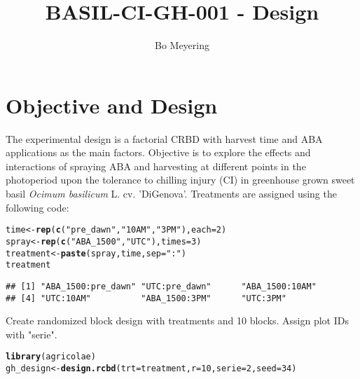 \documentclass{article}\usepackage[]{graphicx}\usepackage[]{color}
\title{BASIL-CI-GH-001 - Design}
\author{Bo Meyering}
\makeatletter
\newcommand{\hlnum}[1]{\textcolor[rgb]{0.686,0.059,0.569}{#1}}%
\newcommand{\hlstr}[1]{\textcolor[rgb]{0.192,0.494,0.8}{#1}}%
\newcommand{\hlstd}[1]{\textcolor[rgb]{0.345,0.345,0.345}{#1}}%
\newcommand{\hlkwb}[1]{\textcolor[rgb]{0.69,0.353,0.396}{#1}}%
\newcommand{\hlkwc}[1]{\textcolor[rgb]{0.333,0.667,0.333}{#1}}%
\newcommand{\hlkwd}[1]{\textcolor[rgb]{0.737,0.353,0.396}{\textbf{#1}}}%
\newenvironment{kframe}{%
 \def\at@end@of@kframe{}%
 \ifinner\ifhmode%
  \def\at@end@of@kframe{\end{minipage}}%
  \begin{minipage}{\columnwidth}%
 \fi\fi%
 \def\FrameCommand##1{\hskip\@totalleftmargin \hskip-\fboxsep
 \colorbox{shadecolor}{##1}\hskip-\fboxsep
     \hskip-\linewidth \hskip-\@totalleftmargin \hskip\columnwidth}%
 \MakeFramed {\advance\hsize-\width
   \@totalleftmargin\z@ \linewidth\hsize
   \@setminipage}}%
 {\par\unskip\endMakeFramed%
 \at@end@of@kframe}
\newenvironment{knitrout}{}{} %
\makeatother
\begin{document}
\maketitle
\section{Objective and Design}
The experimental design is a factorial CRBD with harvest time and ABA applications as the main factors. Objective is to explore the effects and interactions of spraying ABA and harvesting at different points in the photoperiod upon the tolerance to chilling injury (CI) in greenhouse grown sweet basil \emph{Ocimum basilicum} L. cv. 'DiGenova'. Treatments are assigned using the following code:
\begin{knitrout}
\color{fgcolor}\begin{kframe}
\begin{alltt}
\hlstd{time} \hlkwb{<-} \hlkwd{rep}\hlstd{(}\hlkwd{c}\hlstd{(}\hlstr{"pre_dawn"}\hlstd{,} \hlstr{"10AM"}\hlstd{,} \hlstr{"3PM"}\hlstd{),} \hlkwc{each} \hlstd{=} \hlnum{2}\hlstd{)}
\hlstd{spray} \hlkwb{<-} \hlkwd{rep}\hlstd{(}\hlkwd{c}\hlstd{(}\hlstr{"ABA_1500"}\hlstd{,} \hlstr{"UTC"}\hlstd{),} \hlkwc{times} \hlstd{=} \hlnum{3}\hlstd{)}
\hlstd{treatment} \hlkwb{<-} \hlkwd{paste}\hlstd{(spray, time,} \hlkwc{sep} \hlstd{=} \hlstr{":"}\hlstd{)}
\hlstd{treatment}
\end{alltt}
\begin{verbatim}
## [1] "ABA_1500:pre_dawn" "UTC:pre_dawn"      "ABA_1500:10AM"    
## [4] "UTC:10AM"          "ABA_1500:3PM"      "UTC:3PM"
\end{verbatim}
\end{kframe}
\end{knitrout}
Create randomized block design with treatments and 10 blocks. Assign plot IDs with "serie".
\begin{knitrout}
\color{fgcolor}\begin{kframe}
\begin{alltt}
\hlkwd{library}\hlstd{(agricolae)}
\hlstd{gh_design} \hlkwb{<-} \hlkwd{design.rcbd}\hlstd{(}\hlkwc{trt} \hlstd{= treatment,} \hlkwc{r} \hlstd{=} \hlnum{10}\hlstd{,} \hlkwc{serie} \hlstd{=} \hlnum{2}\hlstd{,} \hlkwc{seed} \hlstd{=} \hlnum{34}\hlstd{)}
\end{alltt}
\end{kframe}
\end{knitrout}
\end{document}
